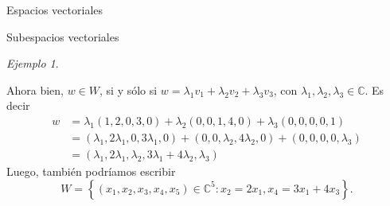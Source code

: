 \documentclass[a4paper,12pt,twoside,spanish,reqno]{amsbook}
\numberwithin{equation}{section}
\theoremstyle{definition}
\theoremstyle{remark}
\newtheorem*{ejemplo*}{Ejemplo}
\newcommand{\C}{\mathbb C}
\begin{document}
\begin{chapter}{Espacios vectoriales}
\begin{section}{Subespacios vectoriales}
\begin{ejemplo*}
\begin{enumerate}
            Ahora bien, $w \in W$, si y sólo si $w = \lambda_1 v_1+\lambda_2 v_2+\lambda_3 v_3$, con $\lambda_1,\lambda_2,\lambda_3 \in \C$. Es decir
            \begin{align*}
                w &= \lambda_1 (1,2,0,3,0)+\lambda_2 (0,0,1,4,0)+\lambda_3 (0,0,0,0,1) \\
                &=  (\lambda_1,2\lambda_1,0,3\lambda_1,0)+ (0,0,\lambda_2,4\lambda_2,0)+ (0,0,0,0,\lambda_3) \\ &=(\lambda_1,2\lambda_1,\lambda_2,3\lambda_1+4\lambda_2,\lambda_3)
            \end{align*} 
            Luego,  también podríamos escribir
            \begin{equation*}
                W = \left\{(x_1,x_2,x_3,x_4,x_5)\in \C^5: x_2 = 2x_1, x_4 = 3x_1+4x_3 \right\}.
            \end{equation*}
            

\end{enumerate}
\end{ejemplo*}
\end{section}
\end{chapter}
\end{document}
